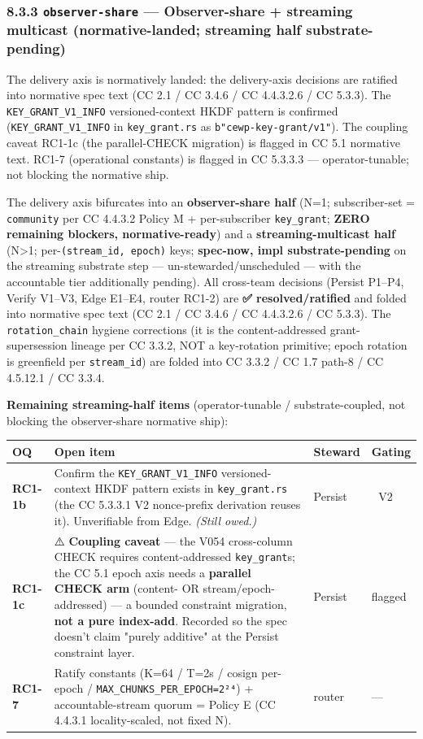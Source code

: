 \documentclass[11pt]{article}
\begin{document}
\subsubsection*{8.3.3 \texttt{observer-share} — Observer-share + streaming multicast (normative-landed; streaming half substrate-pending)}


The delivery axis is normatively landed: the delivery-axis decisions are ratified into normative spec text (CC 2.1 / CC 3.4.6 / CC 4.4.3.2.6 / CC 5.3.3). The \texttt{KEY\_GRANT\_V1\_INFO} versioned-context HKDF pattern is confirmed (\texttt{KEY\_GRANT\_V1\_INFO} in \texttt{key\_grant.rs} as \texttt{b"cewp-key-grant/v1"}). The coupling caveat RC1-1c (the parallel-CHECK migration) is flagged in CC 5.1 normative text. RC1-7 (operational constants) is flagged in CC 5.3.3.3 — operator-tunable; not blocking the normative ship.


The delivery axis bifurcates into an \textbf{observer-share half} (N=1; subscriber-set = \texttt{community} per CC 4.4.3.2 Policy M + per-subscriber \texttt{key\_grant}; \textbf{ZERO remaining blockers, normative-ready}) and a \textbf{streaming-multicast half} (N>1; per-\texttt{(stream\_id, epoch)} keys; \textbf{spec-now, impl substrate-pending} on the streaming substrate step — un-stewarded/unscheduled — with the accountable tier additionally pending). All cross-team decisions (Persist P1–P4, Verify V1–V3, Edge E1–E4, router RC1-2) are \textbf{✅ resolved/ratified} and folded into normative spec text (CC 2.1 / CC 3.4.6 / CC 4.4.3.2.6 / CC 5.3.3). The \texttt{rotation\_chain} hygiene corrections (it is the content-addressed grant-supersession lineage per CC 3.3.2, NOT a key-rotation primitive; epoch rotation is greenfield per \texttt{stream\_id}) are folded into CC 3.3.2 / CC 1.7 path-8 / CC 4.5.12.1 / CC 3.3.4.


\textbf{Remaining streaming-half items} (operator-tunable / substrate-coupled, not blocking the observer-share normative ship):


{\scriptsize
\begin{longtable}{|p{4.0cm}|p{4.0cm}|p{4.0cm}|p{4.0cm}|}\hline
\textbf{OQ} & \textbf{Open item} & \textbf{Steward} & \textbf{Gating} \\ \hline\endhead
\textbf{RC1-1b} & Confirm the \texttt{KEY\_GRANT\_V1\_INFO} versioned-context HKDF pattern exists in \texttt{key\_grant.rs} (the CC 5.3.3.1 V2 nonce-prefix derivation reuses it). Unverifiable from Edge. \textit{(Still owed.)} & Persist & 🔴 V2 \\ \hline
\textbf{RC1-1c} & ⚠️ \textbf{Coupling caveat} — the V054 cross-column CHECK requires content-addressed \texttt{key\_grant}s; the CC 5.1 epoch axis needs a \textbf{parallel CHECK arm} (content- OR stream/epoch-addressed) — a bounded constraint migration, \textbf{not a pure index-add}. Recorded so the spec doesn't claim "purely additive" at the Persist constraint layer. & Persist & flagged \\ \hline
\textbf{RC1-7} & Ratify constants (K=64 / T=2s / cosign per-epoch / \texttt{MAX\_CHUNKS\_PER\_EPOCH=2²⁴}) + accountable-stream quorum = Policy E (CC 4.4.3.1 locality-scaled, not fixed N). & router & — \\ \hline
\end{longtable}}
\end{document}
